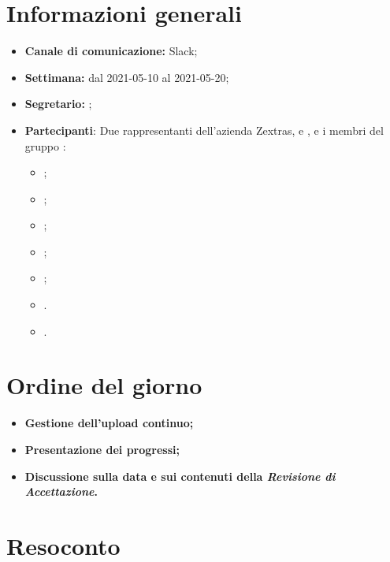 \section{Informazioni generali}

\begin{itemize}

    \item \textbf{Canale di comunicazione:} Slack;

    \item \textbf{Settimana:} dal 2021-05-10 al 2021-05-20;

    \item \textbf{Segretario:} \ACapoRedazione{};

    \item \textbf{Partecipanti}: Due rappresentanti dell'azienda Zextras, \textit{\Alessio{}} e \textit{\Federico{}}, e i membri del gruppo \Gruppo{}:
        \begin{itemize}
            \item \Daniele{};
            \item \Davide{};
            \item \Francesco{};
            \item \Tommaso{};
            \item \Lucrezia{};  
            \item \Matteo{}.
            \item \Giosue{}.
        \end{itemize}
\end{itemize}

\section{Ordine del giorno}

\begin{itemize}
    \item\textbf{Gestione dell'upload continuo;}
    \item\textbf{Presentazione dei progressi;}
    \item\textbf{Discussione sulla data e sui contenuti della \textit{Revisione di Accettazione}.}
\end{itemize}
\newpage


\section{Resoconto}
